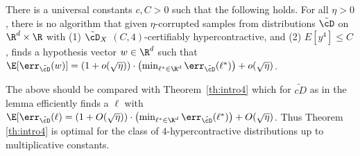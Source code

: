 \begin{lemma}\label{lm:lb1}
There is a universal constants $c, C > 0$ such that the following holds. For all $\eta > 0$, there is no algorithm that given $\eta$-corrupted samples from distributions $\tilde{\cD}$ on $\R^d \times \R$ with (1) $\tilde{\cD}_X$ $(C,4)$-certifiably hypercontractive, and (2) $E[y^4] \leq C$, finds a hypothesis vector $w \in \R^d$ such that $\E[\err_{\tilde{\cD}}(w)]  = (1 + o(\sqrt{\eta})) \cdot \left(\min_{\ell^* \in \R^d} \err_{\tilde{\cD}}(\ell^*)\right) + o(\sqrt{\eta})$. 
\end{lemma}

The above should be compared with Theorem~\ref{th:intro4} which for $\tilde{cD}$ as in the lemma efficiently finds a $\ell$ with $\E[\err_{\tilde{\cD}}(\ell) = (1 + O(\sqrt{\eta})) \cdot \left(\min_{\ell^* \in \R^d} \err_{\tilde{\cD}}(\ell^*)\right) + O(\sqrt{\eta})$. Thus Theorem \ref{th:intro4} is optimal for the class of $4$-hypercontractive distributions up to multiplicative constants. 
